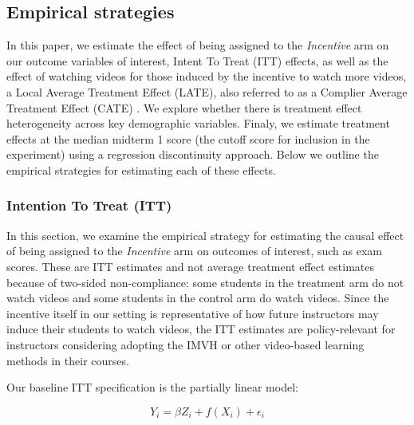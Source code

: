 \documentclass[12pt]{article}
\begin{document}

\subsection{Empirical strategies} \label{empiricalstrat}

In this paper, we estimate the effect of being assigned to the \textit{Incentive} arm on our outcome variables of interest, Intent To Treat (ITT) effects, as well as the effect of watching videos for those induced by the incentive to watch more videos, a Local Average Treatment Effect (LATE), also referred to as a Complier Average Treatment Effect (CATE) \parencite{ir2015}.  We explore whether there is treatment effect heterogeneity across key demographic variables.  Finaly, we estimate treatment effects at the median midterm 1 score (the cutoff score for inclusion in the experiment) using a regression discontinuity approach.  Below we outline the empirical strategies for estimating each of these effects.

\subsubsection{Intention To Treat (ITT)}

In this section, we examine the empirical strategy for estimating the causal effect of being assigned to the \textit{Incentive} arm on outcomes of interest, such as exam scores. These are ITT estimates and not average treatment effect estimates because of two-sided non-compliance: some students in the treatment arm do not watch videos and some students in the control arm do watch videos. Since the incentive itself in our setting is representative of how future instructors may induce their students to watch videos, the ITT estimates are policy-relevant for instructors considering adopting the IMVH or other video-based learning methods in their courses.

Our baseline ITT specification is the partially linear model:

\begin{equation} \label{itt_spec}
	Y_i = \beta Z_i + f(X_i) + \epsilon_i
\end{equation}
\end{document}
